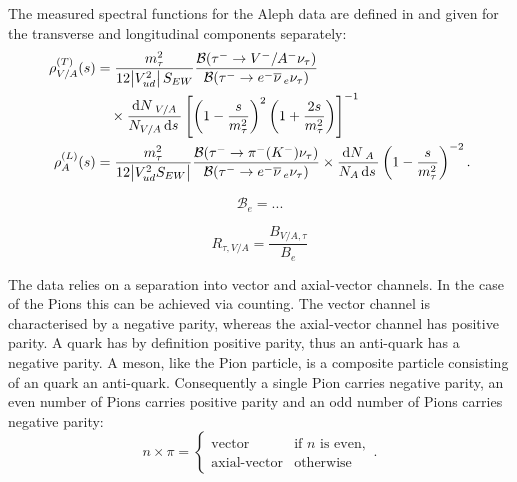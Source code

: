 \documentclass[../../index.tex]{subfiles}
\begin{document}
The measured spectral functions for the Aleph data are defined in
\cite{Davier2007} and given for the transverse and longitudinal components separately:
\begin{equation}
  \begin{split}
    \rho^{(T)}_{V/A}(s) &= \frac{m_\tau^2}{12 \abs{V_{ud}^2}S_{EW}} \frac{\mathcal{B}(\tau^- \to V^-/A^- \nu_\tau)}{\mathcal{B}(\tau^- \to e^- \anti{\nu}_e \nu_\tau)} \\
    &\quad\times \frac{\dif N_{V/A}}{N_{V/A}\dif s} \left[ \left( 1 - \frac{s}{m_\tau^2} \right)^2 \left( 1 + \frac{2s}{m_\tau^2} \right) \right]^{-1} \\
  \rho^{(L)}_{A}(s) &= \frac{m_\tau^2}{12 \abs{V_{ud}^2 S_{EW}}} \frac{\mathcal{B}(\tau^- \to \pi^-(K^-) \nu_\tau)}{\mathcal{B}(\tau^- \to e^- \anti{\nu}_e \nu_\tau)} \times \frac{\dif N_A}{N_A \dif s} \left( 1 - \frac{s}{m_\tau^2} \right)^{-2}.
  \end{split}
\end{equation}

\begin{equation}
  \mathcal{B}_e = ...
\end{equation}

\begin{equation}
  R_{\tau, V/A} = \frac{B_{V/A, \tau}}{B_e}
\end{equation}

The data relies on a separation into vector and axial-vector channels. In the
case of the Pions this can be achieved via counting. The vector channel is
characterised by a negative parity, whereas the axial-vector channel has
positive parity. A quark has by definition positive parity, thus an anti-quark
has a negative parity. A meson, like the Pion particle, is a composite particle
consisting of an quark an anti-quark. Consequently a single Pion carries negative
parity, an even number of Pions carries positive parity and an odd number of
Pions carries negative parity:
\begin{equation}
  n \times \pi = \begin{cases} \mbox{vector} & \mbox{if } n \text{ is even}, \\ \mbox{axial-vector} & \mbox{otherwise} \end{cases}.
\end{equation}
\end{document}
